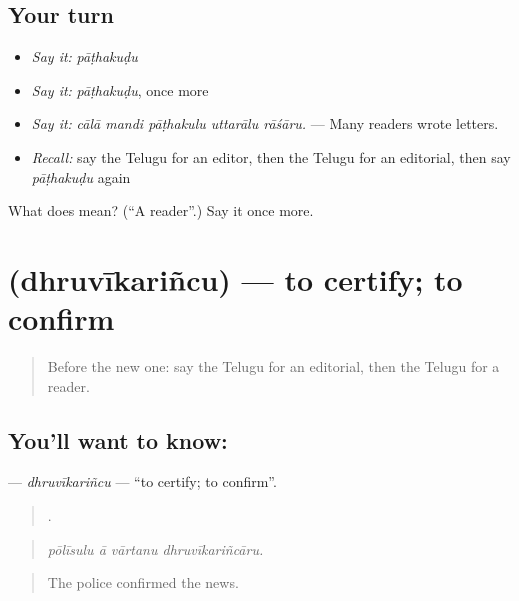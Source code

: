 \subsection*{Your turn}
\begin{itemize}
\raggedright
  \item \emph{Say it:} \emph{pāṭhakuḍu}
  \item \emph{Say it:} \emph{pāṭhakuḍu}, once more
  \item \emph{Say it:} \emph{cālā mandi pāṭhakulu uttarālu rāśāru.} — Many readers wrote letters.
  \item \emph{Recall:} say the Telugu for an editor, then the Telugu for an editorial, then say \emph{pāṭhakuḍu} again
\end{itemize}

\begin{tcolorbox}[breakable,colback=teal!4,colframe=teal!35!black,title={Before you move on}]
What does  mean? (\textquotedblleft{}A reader\textquotedblright{}.) Say it once more.
\end{tcolorbox}
\section[\texorpdfstring{\te{ధ్రువీకరించు} (dhruvīkariñcu)}{ధ్రువీకరించు (dhruvīkariñcu)}]{ (dhruvīkariñcu) — to certify; to confirm}

\label{lesson:TE-C341-dhruvikarincu}



\begin{quote}
Before the new one: say the Telugu for an editorial, then the Telugu for a reader.
\end{quote}

\subsection*{You'll want to know: }
\textbf{} — \emph{dhruvīkariñcu} — \textquotedblleft{}to certify; to confirm\textquotedblright{}.

\begin{quote}
   .
\end{quote}

\begin{quote}
\emph{pōlīsulu ā vārtanu dhruvīkariñcāru.}
\end{quote}

\begin{quote}
The police confirmed the news.
\end{quote}

